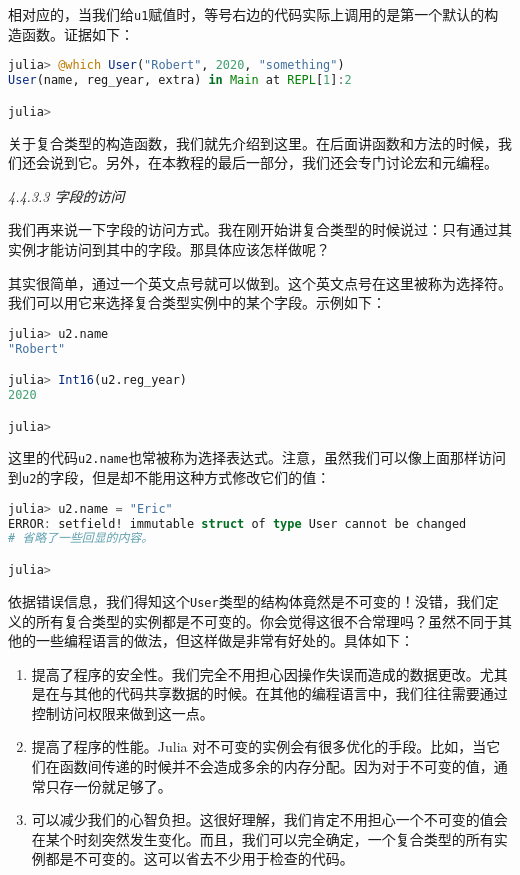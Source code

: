 相对应的，当我们给\verb`u1`赋值时，等号右边的代码实际上调用的是第一个默认的构造函数。证据如下：

\begin{lstlisting}[language=julia]
julia> @which User("Robert", 2020, "something")
User(name, reg_year, extra) in Main at REPL[1]:2

julia> 
\end{lstlisting}

关于复合类型的构造函数，我们就先介绍到这里。在后面讲函数和方法的时候，我们还会说到它。另外，在本教程的最后一部分，我们还会专门讨论宏和元编程。

\textsl{4.4.3.3 字段的访问}

我们再来说一下字段的访问方式。我在刚开始讲复合类型的时候说过：只有通过其实例才能访问到其中的字段。那具体应该怎样做呢？

其实很简单，通过一个英文点号就可以做到。这个英文点号在这里被称为选择符。我们可以用它来选择复合类型实例中的某个字段。示例如下：

\begin{lstlisting}[language=julia]
julia> u2.name
"Robert"

julia> Int16(u2.reg_year)
2020

julia> 
\end{lstlisting}

这里的代码\verb`u2.name`也常被称为选择表达式。注意，虽然我们可以像上面那样访问到\verb`u2`的字段，但是却不能用这种方式修改它们的值：

\begin{lstlisting}[language=julia]
julia> u2.name = "Eric"
ERROR: setfield! immutable struct of type User cannot be changed
# 省略了一些回显的内容。

julia> 
\end{lstlisting}

依据错误信息，我们得知这个\verb`User`类型的结构体竟然是不可变的！没错，我们定义的所有复合类型的实例都是不可变的。你会觉得这很不合常理吗？虽然不同于其他的一些编程语言的做法，但这样做是非常有好处的。具体如下：

\begin{enumerate}
\item 提高了程序的安全性。我们完全不用担心因操作失误而造成的数据更改。尤其是在与其他的代码共享数据的时候。在其他的编程语言中，我们往往需要通过控制访问权限来做到这一点。
\item 提高了程序的性能。Julia 对不可变的实例会有很多优化的手段。比如，当它们在函数间传递的时候并不会造成多余的内存分配。因为对于不可变的值，通常只存一份就足够了。
\item 可以减少我们的心智负担。这很好理解，我们肯定不用担心一个不可变的值会在某个时刻突然发生变化。而且，我们可以完全确定，一个复合类型的所有实例都是不可变的。这可以省去不少用于检查的代码。
\end{enumerate}

